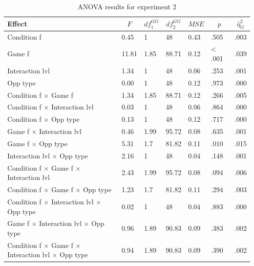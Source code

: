 \documentclass[man,floatsintext]{apa6}
\begin{document}
\begin{table}[tbp]
\begin{center}
\begin{threeparttable}
\caption{\label{tab:exp2-anova}ANOVA results for experiment 2}
\begin{tabular}{lllllll}
\toprule
Effect & \multicolumn{1}{c}{$F$} & \multicolumn{1}{c}{$\mathit{df}_1^{GG}$} & \multicolumn{1}{c}{$\mathit{df}_2^{GG}$} & \multicolumn{1}{c}{$\mathit{MSE}$} & \multicolumn{1}{c}{$p$} & \multicolumn{1}{c}{$\hat{\eta}^2_G$}\\
\midrule
Condition f & 0.45 & 1 & 48 & 0.43 & .505 & .003\\
Game f & 11.81 & 1.85 & 88.71 & 0.12 & < .001 & .039\\
Interaction lvl & 1.34 & 1 & 48 & 0.06 & .253 & .001\\
Opp type & 0.00 & 1 & 48 & 0.12 & .973 & .000\\
Condition f $\times$ Game f & 1.34 & 1.85 & 88.71 & 0.12 & .266 & .005\\
Condition f $\times$ Interaction lvl & 0.03 & 1 & 48 & 0.06 & .864 & .000\\
Condition f $\times$ Opp type & 0.13 & 1 & 48 & 0.12 & .717 & .000\\
Game f $\times$ Interaction lvl & 0.46 & 1.99 & 95.72 & 0.08 & .635 & .001\\
Game f $\times$ Opp type & 5.31 & 1.7 & 81.82 & 0.11 & .010 & .015\\
Interaction lvl $\times$ Opp type & 2.16 & 1 & 48 & 0.04 & .148 & .001\\
Condition f $\times$ Game f $\times$ Interaction lvl & 2.43 & 1.99 & 95.72 & 0.08 & .094 & .006\\
Condition f $\times$ Game f $\times$ Opp type & 1.23 & 1.7 & 81.82 & 0.11 & .294 & .003\\
Condition f $\times$ Interaction lvl $\times$ Opp type & 0.02 & 1 & 48 & 0.04 & .883 & .000\\
Game f $\times$ Interaction lvl $\times$ Opp type & 0.96 & 1.89 & 90.83 & 0.09 & .383 & .002\\
Condition f $\times$ Game f $\times$ Interaction lvl $\times$ Opp type & 0.94 & 1.89 & 90.83 & 0.09 & .390 & .002\\
\bottomrule
\end{tabular}
\end{threeparttable}
\end{center}
\end{table}
\end{document}
